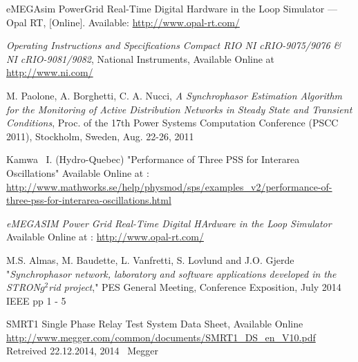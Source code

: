 \documentclass[conference]{IEEEtran}
\begin{document}
\begin{thebibliography}{1}
 eMEGAsim PowerGrid Real-Time Digital Hardware in the Loop Simulator — Opal RT, [Online]. Available: \url{http://www.opal-rt.com/}

 \emph{Operating Instructions and Specifications Compact RIO NI cRIO-9075/9076 \& NI cRIO-9081/9082}, National Instruments, Available Online at \url{http://www.ni.com/}

 M. Paolone, A. Borghetti, C. A. Nucci, \emph{A Synchrophasor Estimation Algorithm for the Monitoring of Active Distribution Networks in Steady State and Transient Conditions}, Proc. of the 17th Power Systems Computation Conference (PSCC 2011), Stockholm, Sweden, Aug. 22-26, 2011 

 Kamwa \ I. (Hydro-Quebec) "Performance of Three PSS for Interarea Oscillations" Available Online at : \url{http://www.mathworks.se/help/physmod/sps/examples_v2/performance-of-three-pss-for-interarea-oscillations.html}

 \emph{eMEGASIM Power Grid Real-Time Digital HArdware in the Loop Simulator} Available Online at : \url{http://www.opal-rt.com/}


 M.S. Almas, M. Baudette, L. Vanfretti, S. Lovlund and J.O. Gjerde "\emph{Synchrophasor network, laboratory and software applications developed in the STRON$g^{2}$rid project}," PES General Meeting, Conference Exposition, July 2014 IEEE pp 1 - 5

 SMRT1 Single Phase Relay Test System Data Sheet, Available Online \url{http://www.megger.com/common/documents/SMRT1_DS_en_V10.pdf} Retreived 22.12.2014, 2014 \textcopyright~Megger





\end{thebibliography}
\end{document}
